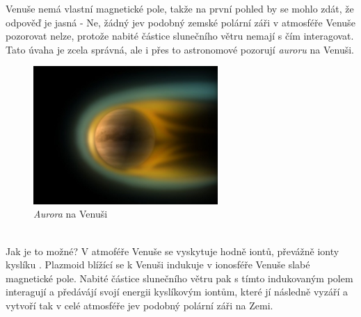 \documentclass{../../../../style/mkimain}
\begin{document}
\noindent{}
\klein
Venuše nemá vlastní magnetické pole, takže na první pohled by se mohlo zdát, že odpověď je jasná - Ne, žádný jev podobný zemské polární záři v
atmosféře Venuše pozorovat nelze, protože nabité částice slunečního větru nemají s čím interagovat. Tato úvaha je zcela správná, ale i přes to astronomové pozorují \emph{auroru} na Venuši.
\begin{figure}[htpb]
    \begin{center}
    \includegraphics[width=7cm]{images/venus-aurora.jpg}
    \\
    \emph{Aurora} na Venuši\footnotemark
    \end{center}
\end{figure}
\\ Jak je to možné? V atmoféře Venuše se vyskytuje hodně iontů, převážně ionty kyslíku . Plazmoid blížící se k Venuši indukuje v
ionosféře Venuše slabé magnetické pole. Nabité částice slunečního větru pak s tímto indukovaným polem interagují a předávájí svojí energii
kyslíkovým iontům, které jí následně vyzáří a vytvoří tak v celé atmosféře jev podobný polární záři na Zemi.
\end{document}
